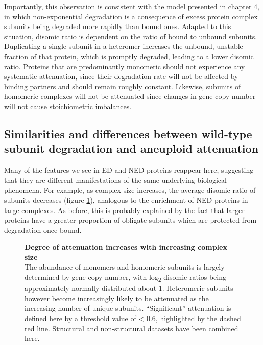 \documentclass[a4paper,11pt,twoside,openright]{scrbook}
\begin{document}
Importantly, this observation is consistent with the model presented in chapter 4, in which non-exponential degradation is a consequence of excess protein complex subunits being degraded more rapidly than bound ones. Adapted to this situation, disomic ratio is dependent on the ratio of bound to unbound subunits. Duplicating a single subunit in a heteromer increases the unbound, unstable fraction of that protein, which is promptly degraded, leading to a lower disomic ratio. Proteins that are predominantly monomeric should not experience any systematic attenuation, since their degradation rate will not be affected by binding partners and should remain roughly constant. Likewise, subunits of homomeric complexes will not be attenuated since changes in gene copy number will not cause stoichiometric imbalances.

\subsection{Similarities and differences between wild-type subunit degradation and aneuploid attenuation}

Many of the features we see in ED and NED proteins reappear here, suggesting that they are different manifestations of the same underlying biological phenomena. For example, as complex size increases, the average disomic ratio of subunits decreases (figure \ref{figure:aneuploidusubs}), analogous to the enrichment of NED proteins in large complexes. As before, this is probably explained by the fact that larger proteins have a greater proportion of obligate subunits which are protected from degradation once bound.

\begin{figure}[h]
    \caption[Degree of attenuation increases with increasing complex size]{\sffamily \textbf{Degree of attenuation increases with increasing complex size} \\ \small The abundance of monomers and homomeric subunits is largely determined by gene copy number, with log\textsubscript{2} disomic ratios being approximately normally distributed about 1. Heteromeric subunits however become increasingly likely to be attenuated as the increasing number of unique subunits. “Significant” attenuation is defined here by a threshold value of < 0.6, highlighted by the dashed red line. Structural and non-structural datasets have been combined here.}
    \label{figure:aneuploidusubs}
\end{figure}
\end{document}
